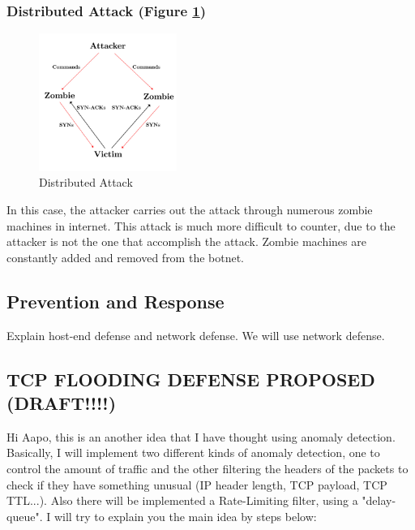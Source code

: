 \subsubsection{Distributed Attack (Figure \ref{fig:DistributedAttackSYN})}
\label{subsec:SYNDistributedAttack}

\begin{figure}[H]
\centering
\includegraphics[width=0.4\textwidth]{./images/DistributedAttackSYN.pdf}
\caption{Distributed Attack} \label{fig:DistributedAttackSYN}
\end{figure}

In this case, the attacker carries out the attack through numerous zombie machines in internet. This attack is much more difficult to counter, due to the attacker is not the one that accomplish the attack. Zombie machines are constantly added and removed from the botnet.


\subsection{Prevention and Response}

Explain host-end defense and network defense. We will use network defense.

\subsection{TCP FLOODING DEFENSE PROPOSED (DRAFT!!!!)}

Hi Aapo, this is an another idea that I have thought using anomaly detection. Basically, I will implement two different kinds of anomaly detection, one to control the amount of traffic and the other filtering the headers of the packets to check if they have something unusual (IP header length, TCP payload, TCP TTL...). Also there will be implemented a Rate-Limiting filter, using a "delay-queue". I will try to explain you the main idea by steps below:\\

